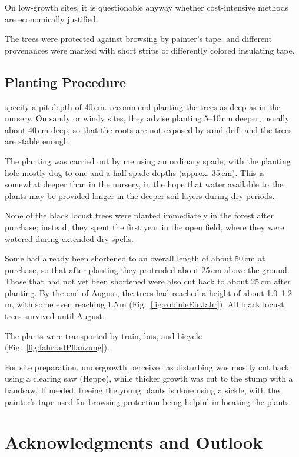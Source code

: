 On low-growth sites, it is questionable anyway whether cost-intensive methods are economically justified.

The trees were protected against browsing by painter’s tape, and different provenances were marked with short strips of differently colored insulating tape.

\subsection{Planting Procedure}

\citet{ciuvat2022robinieRumaenien} specify a pit depth of 40\,cm. \citet[pp.~164--165, 173]{vadas1911robinie} recommend planting the trees as deep as in the nursery. On sandy or windy sites, they advise planting 5--10\,cm deeper, usually about 40\,cm deep, so that the roots are not exposed by sand drift and the trees are stable enough.

The planting was carried out by me using an ordinary spade, with the planting hole mostly dug to one and a half spade depths (approx. 35\,cm). This is somewhat deeper than in the nursery, in the hope that water available to the plants may be provided longer in the deeper soil layers during dry periods.

None of the black locust trees were planted immediately in the forest after purchase; instead, they spent the first year in the open field, where they were watered during extended dry spells.

Some had already been shortened to an overall length of about 50\,cm at purchase, so that after planting they protruded about 25\,cm above the ground. Those that had not yet been shortened were also cut back to about 25\,cm after planting. By the end of August, the trees had reached a height of about 1.0--1.2\,m, with some even reaching 1.5\,m (Fig.~\ref{fig:robinieEinJahr}). All black locust trees survived until August.


The plants were transported by train, bus, and bicycle (Fig.~\ref{fig:fahrradPflanzung}).


For site preparation, undergrowth perceived as disturbing was mostly cut back using a clearing saw (Heppe), while thicker growth was cut to the stump with a handsaw. If needed, freeing the young plants is done using a sickle, with the painter’s tape used for browsing protection being helpful in locating the plants.

\section*{Acknowledgments and Outlook}

